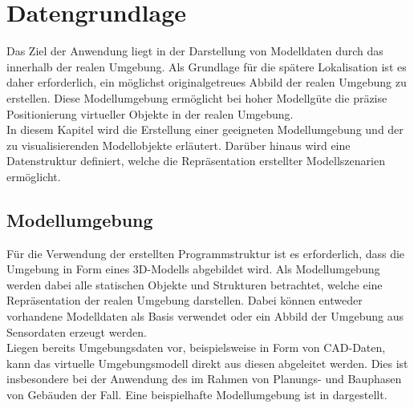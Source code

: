 \chapter{Datengrundlage}
\label{chap.modeldata}
\prever{
}

Das Ziel der Anwendung liegt in der Darstellung von Modelldaten durch das \kps{} innerhalb der realen Umgebung. Als Grundlage für die spätere Lokalisation ist es daher erforderlich, ein möglichst originalgetreues Abbild der realen Umgebung zu erstellen. Diese Modellumgebung ermöglicht bei hoher Modellgüte die präzise Positionierung virtueller Objekte in der realen Umgebung.\\
In diesem Kapitel wird die Erstellung einer geeigneten Modellumgebung und der zu visualisierenden Modellobjekte erläutert. Darüber hinaus wird eine Datenstruktur definiert, welche die Repräsentation erstellter Modellszenarien ermöglicht.


\section{Modellumgebung}
\label{chap.slam}
Für die Verwendung der erstellten Programmstruktur ist es erforderlich, dass die Umgebung in Form eines 3D-Modells abgebildet wird. Als Modellumgebung werden dabei alle statischen Objekte und Strukturen betrachtet, welche eine Repräsentation der realen Umgebung darstellen. Dabei können entweder vorhandene Modelldaten als Basis verwendet oder ein Abbild der Umgebung aus Sensordaten erzeugt werden.\\

Liegen bereits Umgebungsdaten vor, beispielsweise in Form von CAD-Daten, kann das virtuelle Umgebungsmodell direkt aus diesen abgeleitet werden. Dies ist insbesondere bei der Anwendung des  im Rahmen von Planungs- und Bauphasen von Gebäuden der Fall. Eine beispielhafte Modellumgebung ist in  dargestellt.\\

